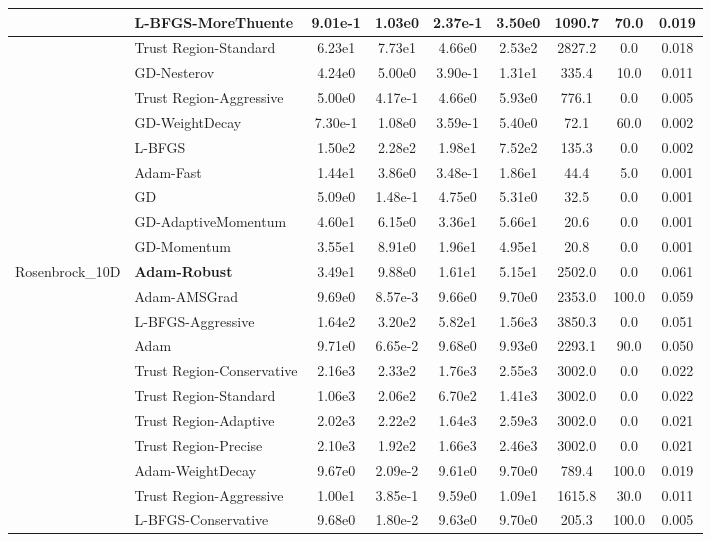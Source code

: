 \documentclass{article}
\begin{document}
\begin{longtable}{|l|l|c|c|c|c|c|c|c|}
\hline
 & L-BFGS-MoreThuente & 9.01e-1 & 1.03e0 & 2.37e-1 & 3.50e0 & 1090.7 & 70.0 & 0.019 \\
\hline
 & Trust Region-Standard & 6.23e1 & 7.73e1 & 4.66e0 & 2.53e2 & 2827.2 & 0.0 & 0.018 \\
\hline
 & GD-Nesterov & 4.24e0 & 5.00e0 & 3.90e-1 & 1.31e1 & 335.4 & 10.0 & 0.011 \\
\hline
 & Trust Region-Aggressive & 5.00e0 & 4.17e-1 & 4.66e0 & 5.93e0 & 776.1 & 0.0 & 0.005 \\
\hline
 & GD-WeightDecay & 7.30e-1 & 1.08e0 & 3.59e-1 & 5.40e0 & 72.1 & 60.0 & 0.002 \\
\hline
 & L-BFGS & 1.50e2 & 2.28e2 & 1.98e1 & 7.52e2 & 135.3 & 0.0 & 0.002 \\
\hline
 & Adam-Fast & 1.44e1 & 3.86e0 & 3.48e-1 & 1.86e1 & 44.4 & 5.0 & 0.001 \\
\hline
 & GD & 5.09e0 & 1.48e-1 & 4.75e0 & 5.31e0 & 32.5 & 0.0 & 0.001 \\
\hline
 & GD-AdaptiveMomentum & 4.60e1 & 6.15e0 & 3.36e1 & 5.66e1 & 20.6 & 0.0 & 0.001 \\
\hline
 & GD-Momentum & 3.55e1 & 8.91e0 & 1.96e1 & 4.95e1 & 20.8 & 0.0 & 0.001 \\
Rosenbrock\_10D & \textbf{Adam-Robust} & 3.49e1 & 9.88e0 & 1.61e1 & 5.15e1 & 2502.0 & 0.0 & 0.061 \\
\hline
 & Adam-AMSGrad & 9.69e0 & 8.57e-3 & 9.66e0 & 9.70e0 & 2353.0 & 100.0 & 0.059 \\
\hline
 & L-BFGS-Aggressive & 1.64e2 & 3.20e2 & 5.82e1 & 1.56e3 & 3850.3 & 0.0 & 0.051 \\
\hline
 & Adam & 9.71e0 & 6.65e-2 & 9.68e0 & 9.93e0 & 2293.1 & 90.0 & 0.050 \\
\hline
 & Trust Region-Conservative & 2.16e3 & 2.33e2 & 1.76e3 & 2.55e3 & 3002.0 & 0.0 & 0.022 \\
\hline
 & Trust Region-Standard & 1.06e3 & 2.06e2 & 6.70e2 & 1.41e3 & 3002.0 & 0.0 & 0.022 \\
\hline
 & Trust Region-Adaptive & 2.02e3 & 2.22e2 & 1.64e3 & 2.59e3 & 3002.0 & 0.0 & 0.021 \\
\hline
 & Trust Region-Precise & 2.10e3 & 1.92e2 & 1.66e3 & 2.46e3 & 3002.0 & 0.0 & 0.021 \\
\hline
 & Adam-WeightDecay & 9.67e0 & 2.09e-2 & 9.61e0 & 9.70e0 & 789.4 & 100.0 & 0.019 \\
\hline
 & Trust Region-Aggressive & 1.00e1 & 3.85e-1 & 9.59e0 & 1.09e1 & 1615.8 & 30.0 & 0.011 \\
\hline
 & L-BFGS-Conservative & 9.68e0 & 1.80e-2 & 9.63e0 & 9.70e0 & 205.3 & 100.0 & 0.005 \\

\end{longtable}
\end{document}
